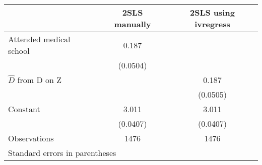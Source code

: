 \begin{tabular}{l*{2}{c}}
\hline\hline
                    &\multicolumn{1}{c}{2SLS manually}&\multicolumn{1}{c}{2SLS using ivregress}\\
\hline
Attended medical school&       0.187&            \\
                    &    (0.0504)&            \\
[1em]
$\widehat{D}$ from D on Z&            &       0.187\\
                    &            &    (0.0505)\\
[1em]
Constant            &       3.011&       3.011\\
                    &    (0.0407)&    (0.0407)\\
\hline
Observations        &        1476&        1476\\
\hline\hline
\multicolumn{3}{l}{\footnotesize Standard errors in parentheses}\\
\end{tabular}
